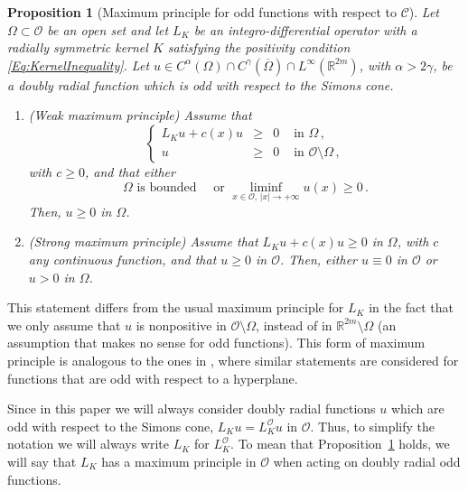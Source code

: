\documentclass[12pt,reqno]{amsart}
\newtheorem{proposition}[theorem]{Proposition}
\theoremstyle{definition}
\theoremstyle{remark}
\newcommand{\con}[1]{\mathbb{#1}}
\newcommand{\R}{\con{R}} %
\newcommand{\ccal}{\mathscr{C}}
\newcommand{\ocal}{\mathcal{O}}
\newcommand{\s}{\gamma}
\newcommand\beqc[1]{\left\{\begin{array}{#1}}
\newcommand\eeqc{\end{array} \right.}
\def\PDEsystem{rcll}
\numberwithin{equation}{section}
\begin{document}
	\begin{proposition}[Maximum principle for odd functions with respect to $\ccal$]
		\label{Prop:MaximumPrincipleForOddFunctions} Let $\Omega \subset \ocal$ be an open set and let $L_K$ be an integro-differential operator with a radially symmetric kernel $K$ satisfying the positivity condition \eqref{Eq:KernelInequality}.  Let $u\in C^{\alpha}(\Omega)\cap C^{\s}(\overline{\Omega})\cap L^\infty(\R^{2m})$, with $\alpha > 2\s$, be a doubly radial function which is odd with respect to the Simons cone. 
		
		\begin{enumerate}[label=(\roman{*})]
			\item  (Weak maximum principle)
			Assume that
			$$
			\beqc{\PDEsystem}
			L_K u + c(x) u & \geq & 0 & \text{ in } \Omega\,,\\
			u & \geq & 0 & \text{ in } \ocal \setminus \Omega\,,
			\eeqc
			$$
			with $c \geq 0$, and that either
			$$
			\Omega \text{ is bounded} \quad \text{ or } \liminf_{x \in \ocal,\,|x|\to +\infty} u(x) \geq 0\,.
			$$
			Then, $u \geq 0$ in $\Omega$.
			
			\item (Strong maximum principle)  
			Assume that $L_K u + c(x) u\geq 0$ in $\Omega$, with $c$ any continuous function, and that $u\geq 0$ in $\ocal$. Then, either $u\equiv 0$ in $\ocal$ or $u > 0$ in $\Omega$.
		\end{enumerate} 
	\end{proposition}
	
	This statement differs from the usual maximum principle for $L_K$ in the fact that we only assume that $u$ is nonpositive in $\ocal\setminus \Omega$, instead of in $\R^{2m}\setminus \Omega$ (an assumption that makes no sense for odd functions). This form of maximum principle is analogous to the ones in \cite{ChenLiLi, JarohsWeth}, where similar statements are considered for functions that are odd with respect to a hyperplane.
	
	Since in this paper we will always consider doubly radial functions $u$ which are odd with respect to the Simons cone, $L_K u =L_K^\ocal u$ in $\ocal$. Thus, to simplify the notation we will always write $L_K$ for $L_K^\ocal$. To mean that Proposition~\ref{Prop:MaximumPrincipleForOddFunctions} holds, we will say that $L_K$ has a maximum principle in $\ocal$ when acting on doubly radial odd functions.
	
\end{document}
